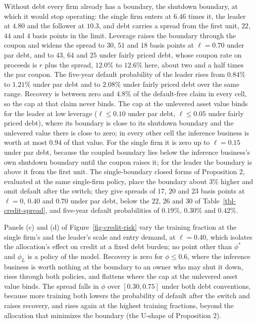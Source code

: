 \documentclass[
  11pt,
  letterpaper,
]{scrartcl}
\begin{document}
Without debt every firm already has a boundary, the shutdown boundary,
at which it would stop operating: the single firm enters at \(6.46\)
times it, the leader at \(4.80\) and the follower at \(10.3\), and debt
carries a spread from the first unit, \(22\), \(44\) and \(4\) basis
points in the limit. Leverage raises the boundary through the coupon and
widens the spread to \(30\), \(51\) and \(18\) basis points at
\(\ell = 0.70\) under par debt, and to \(43\), \(64\) and \(25\) under
fairly priced debt, whose coupon rate on proceeds is \(r\) plus the
spread, \(12.0\%\) to \(12.6\%\) here, about two and a half times the
par coupon. The five-year default probability of the leader rises from
\(0.84\%\) to \(1.21\%\) under par debt and to \(2.08\%\) under fairly
priced debt over the same range. Recovery is between zero and \(4.8\%\)
of the default-free claim in every cell, so the cap at that claim never
binds. The cap at the unlevered asset value binds for the leader at low
leverage (\(\ell \leq 0.10\) under par debt, \(\ell \leq 0.05\) under
fairly priced debt), where its boundary is close to its shutdown
boundary and the unlevered value there is close to zero; in every other
cell the inference business is worth at most \(0.94\) of that value. For
the single firm it is zero up to \(\ell = 0.15\) under par debt, because
the coupled boundary lies below the inference business's own shutdown
boundary until the coupon raises it; for the leader the boundary is
above it from the first unit. The single-boundary closed forms of
Proposition 2, evaluated at the same single-firm policy, place the
boundary about \(3\%\) higher and omit default after the switch; they
give spreads of \(17\), \(20\) and \(23\) basis points at \(\ell = 0\),
\(0.40\) and \(0.70\) under par debt, below the \(22\), \(26\) and
\(30\) of Table~\ref{tbl-credit-spread}, and five-year default
probabilities of \(0.19\%\), \(0.30\%\) and \(0.42\%\).

Panels (c) and (d) of Figure~\ref{fig-credit-risk} vary the training
fraction at the single firm's and the leader's scale and entry demand,
at \(\ell = 0.40\), which isolates the allocation's effect on credit at
a fixed debt burden; no point other than \(\phi^*\) and \(\phi_L\) is a
policy of the model. Recovery is zero for \(\phi \leq 0.6\), where the
inference business is worth nothing at the boundary to an owner who may
shut it down, rises through both policies, and flattens where the cap at
the unlevered asset value binds. The spread falls in \(\phi\) over
\([0.30, 0.75]\) under both debt conventions, because more training both
lowers the probability of default after the switch and raises recovery,
and rises again at the highest training fractions, beyond the allocation
that minimizes the boundary (the U-shape of Proposition 2).
\end{document}
